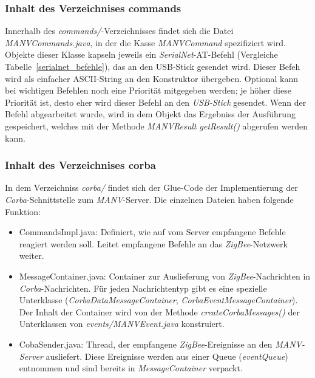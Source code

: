     \subsubsection{Inhalt des Verzeichnises commands}

    Innerhalb des \emph{commands/}-Verzeichnisses findet sich die Datei \emph{MANVCommands.java},
    in der die Kasse \emph{MANVCommand} spezifiziert wird. Objekte dieser Klasse kapseln jeweils
    ein \emph{SerialNet}-AT-Befehl (Vergleiche Tabelle~\ref{serialnet_befehle}), das an den
    USB-Stick gesendet wird. Dieser Befeh wird als einfacher ASCII-String an den Konstruktor
    übergeben. Optional kann bei wichtigen Befehlen noch eine Priorität mitgegeben werden;
    je höher diese Priorität ist, desto eher wird dieser Befehl an den \emph{USB-Stick}
    gesendet. Wenn der Befehl abgearbeitet wurde, wird in dem Objekt das Ergebniss
    der Ausführung gespeichert, welches mit der Methode \emph{MANVResult getResult()}
    abgerufen werden kann.

    \subsubsection{Inhalt des Verzeichnises corba}

    In dem Verzeichniss \emph{corba/} findet sich der Glue-Code der Implementierung der \emph{Corba}-Schnittstelle
    zum \emph{MANV}-Server. Die einzelnen Dateien haben folgende Funktion:

    \begin{itemize}
        \item{CommandsImpl.java:} Definiert, wie auf vom Server empfangene Befehle reagiert werden soll.
                                  Leitet empfangene Befehle an das \emph{ZigBee}-Netzwerk weiter.
        \item{MessageContainer.java:} Container zur Auslieferung von \emph{ZigBee}-Nachrichten in \emph{Corba}-Nachrichten.
                                      Für jeden Nachrichtentyp gibt es eine spezielle Unterklasse (\emph{CorbaDataMessageContainer},
                                      \emph{CorbaEventMessageContainer}). Der Inhalt der Container wird von der Methode 
                                      \emph{createCorbaMessages()} der Unterklassen von \emph{events/MANVEvent.java}
                                      konstruiert.
        \item{CobaSender.java:} Thread, der empfangene \emph{ZigBee}-Ereignisse an den \emph{MANV-Server} ausliefert.
                                Diese Ereignisse werden aus einer Queue (\emph{eventQueue}) entnommen und sind
                                bereits in \emph{MessageContainer} verpackt.
    \end{itemize}

